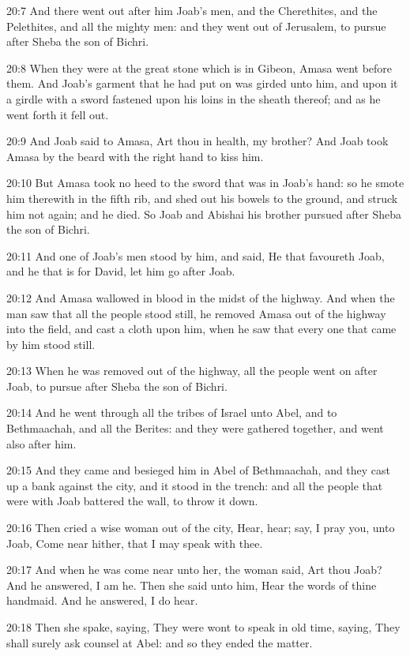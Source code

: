 20:7 And there went out after him Joab's men, and the Cherethites, and
the Pelethites, and all the mighty men: and they went out of
Jerusalem, to pursue after Sheba the son of Bichri.

20:8 When they were at the great stone which is in Gibeon, Amasa went
before them. And Joab's garment that he had put on was girded unto
him, and upon it a girdle with a sword fastened upon his loins in the
sheath thereof; and as he went forth it fell out.

20:9 And Joab said to Amasa, Art thou in health, my brother? And Joab
took Amasa by the beard with the right hand to kiss him.

20:10 But Amasa took no heed to the sword that was in Joab's hand: so
he smote him therewith in the fifth rib, and shed out his bowels to
the ground, and struck him not again; and he died. So Joab and Abishai
his brother pursued after Sheba the son of Bichri.

20:11 And one of Joab's men stood by him, and said, He that favoureth
Joab, and he that is for David, let him go after Joab.

20:12 And Amasa wallowed in blood in the midst of the highway. And
when the man saw that all the people stood still, he removed Amasa out
of the highway into the field, and cast a cloth upon him, when he saw
that every one that came by him stood still.

20:13 When he was removed out of the highway, all the people went on
after Joab, to pursue after Sheba the son of Bichri.

20:14 And he went through all the tribes of Israel unto Abel, and to
Bethmaachah, and all the Berites: and they were gathered together, and
went also after him.

20:15 And they came and besieged him in Abel of Bethmaachah, and they
cast up a bank against the city, and it stood in the trench: and all
the people that were with Joab battered the wall, to throw it down.

20:16 Then cried a wise woman out of the city, Hear, hear; say, I pray
you, unto Joab, Come near hither, that I may speak with thee.

20:17 And when he was come near unto her, the woman said, Art thou
Joab?  And he answered, I am he. Then she said unto him, Hear the
words of thine handmaid. And he answered, I do hear.

20:18 Then she spake, saying, They were wont to speak in old time,
saying, They shall surely ask counsel at Abel: and so they ended the
matter.

